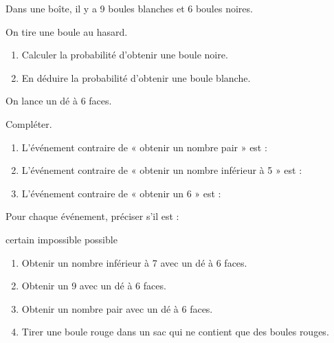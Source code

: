 \documentclass[11pt]{article}
\begin{document}
\begin{exercice}

Dans une boîte, il y a 9 boules blanches et 6 boules noires.

On tire une boule au hasard.

\begin{enumerate}
    \item Calculer la probabilité d'obtenir une boule noire.
    \item En déduire la probabilité d'obtenir une boule blanche.
\end{enumerate}

\end{exercice}


\begin{exercice}

On lance un dé à 6 faces.

Compléter.

\begin{enumerate}
    \item L'événement contraire de « obtenir un nombre pair » est :
    \dotfill

    \item L'événement contraire de « obtenir un nombre inférieur à 5 » est :
    \dotfill

    \item L'événement contraire de « obtenir un 6 » est :
    \dotfill
\end{enumerate}

\end{exercice}


\begin{exercice}

Pour chaque événement, préciser s'il est :

\begin{center}
certain \hspace{1cm} impossible \hspace{1cm} possible
\end{center}

\begin{enumerate}
    \item Obtenir un nombre inférieur à 7 avec un dé à 6 faces.
    \item Obtenir un 9 avec un dé à 6 faces.
    \item Obtenir un nombre pair avec un dé à 6 faces.
    \item Tirer une boule rouge dans un sac qui ne contient que des boules rouges.
\end{enumerate}

\end{exercice}
\end{document}
